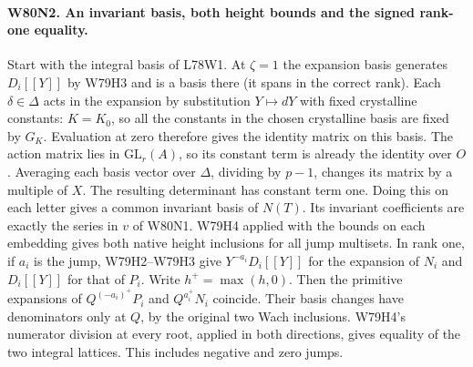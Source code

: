 \paragraph{W80N2. An invariant basis, both height bounds and the signed rank-one equality.}
Start with the integral basis of L78W1. At $\zeta=1$ the expansion
basis generates $D_i[[Y]]$ by W79H3 and is a basis there (it spans
in the correct rank). Each $\delta\in\Delta$ acts in the expansion
by substitution $Y\mapsto dY$ with fixed crystalline constants:
$K=K_0$, so all the constants in the chosen crystalline basis are
fixed by $G_K$. Evaluation at zero therefore gives the identity
matrix on this basis. The action matrix lies in $\mathrm{GL}_r(A)$,
so its constant term is already the identity over $O$. Averaging
each basis vector over $\Delta$, dividing by $p-1$, changes its matrix
by a multiple of $X$. The resulting determinant has constant term one.
Doing this on each letter gives a common invariant basis of $N(T)$.
Its invariant coefficients are exactly the series in $v$ of W80N1.
W79H4 applied with the bounds on each embedding gives both native
height inclusions for all jump multisets. In rank one, if $a_i$ is
the jump, W79H2--W79H3 give $Y^{-a_i} D_i[[Y]]$ for the expansion
of $N_i$ and $D_i[[Y]]$ for that of $P_i$. Write $h^+=\max(h,0)$.
Then the primitive expansions of $Q^{(-a_i)^+}P_i$ and
$Q^{a_i^+}N_i$ coincide. Their basis changes have denominators only
at $Q$, by the original two Wach inclusions. W79H4's numerator
division at every root, applied in both directions, gives equality
of the two integral lattices. This includes negative and zero jumps.

